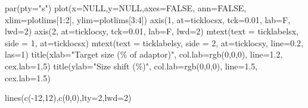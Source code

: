 \documentclass[
]{article}
\newenvironment{Shaded}{\begin{snugshade}}{\end{snugshade}}
\newcommand{\AttributeTok}[1]{\textcolor[rgb]{0.77,0.63,0.00}{#1}}
\newcommand{\ConstantTok}[1]{\textcolor[rgb]{0.00,0.00,0.00}{#1}}
\newcommand{\DecValTok}[1]{\textcolor[rgb]{0.00,0.00,0.81}{#1}}
\newcommand{\FloatTok}[1]{\textcolor[rgb]{0.00,0.00,0.81}{#1}}
\newcommand{\FunctionTok}[1]{\textcolor[rgb]{0.00,0.00,0.00}{#1}}
\newcommand{\NormalTok}[1]{#1}
\newcommand{\SpecialCharTok}[1]{\textcolor[rgb]{0.00,0.00,0.00}{#1}}
\newcommand{\StringTok}[1]{\textcolor[rgb]{0.31,0.60,0.02}{#1}}
\begin{document}
\begin{Shaded}
\begin{Highlighting}[]
\FunctionTok{par}\NormalTok{(}\AttributeTok{pty=}\StringTok{"s"}\NormalTok{) }
\FunctionTok{plot}\NormalTok{(}\AttributeTok{x=}\ConstantTok{NULL}\NormalTok{,}\AttributeTok{y=}\ConstantTok{NULL}\NormalTok{,}\AttributeTok{axes=}\ConstantTok{FALSE}\NormalTok{, }\AttributeTok{ann=}\ConstantTok{FALSE}\NormalTok{, }\AttributeTok{xlim=}\NormalTok{plotlims[}\DecValTok{1}\SpecialCharTok{:}\DecValTok{2}\NormalTok{], }\AttributeTok{ylim=}\NormalTok{plotlims[}\DecValTok{3}\SpecialCharTok{:}\DecValTok{4}\NormalTok{])   }
\FunctionTok{axis}\NormalTok{(}\DecValTok{1}\NormalTok{, }\AttributeTok{at=}\NormalTok{ticklocsx, }\AttributeTok{tck=}\FloatTok{0.01}\NormalTok{, }\AttributeTok{lab=}\NormalTok{F, }\AttributeTok{lwd=}\DecValTok{2}\NormalTok{)    }
\FunctionTok{axis}\NormalTok{(}\DecValTok{2}\NormalTok{, }\AttributeTok{at=}\NormalTok{ticklocsy, }\AttributeTok{tck=}\FloatTok{0.01}\NormalTok{, }\AttributeTok{lab=}\NormalTok{F, }\AttributeTok{lwd=}\DecValTok{2}\NormalTok{)}
\FunctionTok{mtext}\NormalTok{(}\AttributeTok{text =}\NormalTok{ ticklabelsx, }\AttributeTok{side =} \DecValTok{1}\NormalTok{, }\AttributeTok{at=}\NormalTok{ticklocsx)   }
\FunctionTok{mtext}\NormalTok{(}\AttributeTok{text =}\NormalTok{ ticklabelsy, }\AttributeTok{side =} \DecValTok{2}\NormalTok{, }\AttributeTok{at=}\NormalTok{ticklocsy, }\AttributeTok{line=}\FloatTok{0.2}\NormalTok{, }\AttributeTok{las=}\DecValTok{1}\NormalTok{)}
\FunctionTok{title}\NormalTok{(}\AttributeTok{xlab=}\StringTok{"Target size (\% of adaptor)"}\NormalTok{, }\AttributeTok{col.lab=}\FunctionTok{rgb}\NormalTok{(}\DecValTok{0}\NormalTok{,}\DecValTok{0}\NormalTok{,}\DecValTok{0}\NormalTok{), }\AttributeTok{line=}\FloatTok{1.2}\NormalTok{, }\AttributeTok{cex.lab=}\FloatTok{1.5}\NormalTok{)   }
\FunctionTok{title}\NormalTok{(}\AttributeTok{ylab=}\StringTok{"Size shift (\%)"}\NormalTok{, }\AttributeTok{col.lab=}\FunctionTok{rgb}\NormalTok{(}\DecValTok{0}\NormalTok{,}\DecValTok{0}\NormalTok{,}\DecValTok{0}\NormalTok{), }\AttributeTok{line=}\FloatTok{1.5}\NormalTok{, }\AttributeTok{cex.lab=}\FloatTok{1.5}\NormalTok{)}

\FunctionTok{lines}\NormalTok{(}\FunctionTok{c}\NormalTok{(}\SpecialCharTok{{-}}\DecValTok{12}\NormalTok{,}\DecValTok{12}\NormalTok{),}\FunctionTok{c}\NormalTok{(}\DecValTok{0}\NormalTok{,}\DecValTok{0}\NormalTok{),}\AttributeTok{lty=}\DecValTok{2}\NormalTok{,}\AttributeTok{lwd=}\DecValTok{2}\NormalTok{)}


\end{Highlighting}
\end{Shaded}
\end{document}
